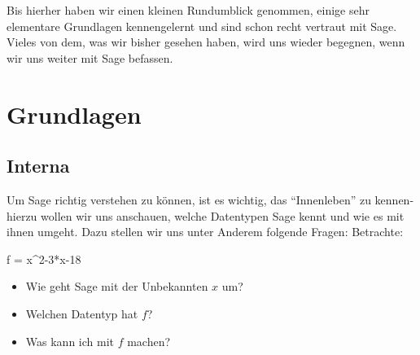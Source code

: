 \documentclass[fontsize=12pt,paper=a4,twoside,bibtotoc,idxtotoc,
liststotoc,pagesize,BCOR1.2cm,DIV15,chapterprefix,pagesize=pdftex]{scrbook}
\begin{document}
Bis hierher haben wir einen kleinen Rundumblick genommen, einige sehr elementare Grundlagen kennengelernt und sind schon recht vertraut mit 
Sage. Vieles von dem, was wir bisher gesehen haben, wird uns wieder begegnen, wenn wir uns weiter mit Sage befassen.
\chapter{Grundlagen}
\section{Interna}
Um Sage richtig verstehen zu können, ist es wichtig, das ``Innenleben'' zu kennen- hierzu wollen wir uns anschauen, welche Datentypen Sage 
kennt und wie es mit ihnen umgeht. Dazu stellen wir uns unter Anderem folgende Fragen:\newline
Betrachte:
\begin{sagein}
f = x^2-3*x-18
\end{sagein}
\begin{itemize}
\item Wie geht Sage mit der Unbekannten $x$ um?
\item Welchen Datentyp hat $f$?
\item Was kann ich mit $f$ machen?
\end{itemize}
\end{document}
